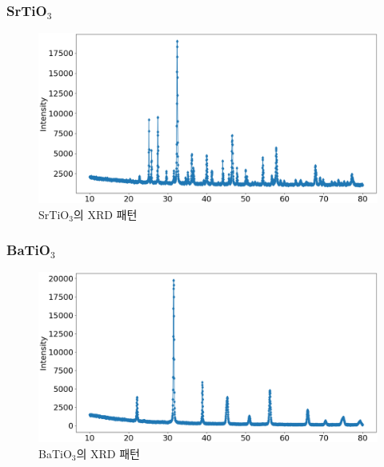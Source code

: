 \documentclass[aps,reprint,superscriptaddress,10pt]{revtex4-2}
\begin{document}
\subsubsection{SrTiO$_3$}
\begin{figure}[h!tb]
  \centering
  \includegraphics[scale=0.16]{Sr.png}
  \caption{SrTiO$_3$의 XRD 패턴}
  \label{fig:Sr}
\end{figure}
\vspace{-1.2cm}
\subsubsection{BaTiO$_3$}
  \begin{figure}[h!tb]
    \centering
    \includegraphics[scale=0.16]{Ba.png}
    \caption{BaTiO$_3$의 XRD 패턴}
    \label{fig:Ba}
    \end{figure}
\newpage
\end{document}
